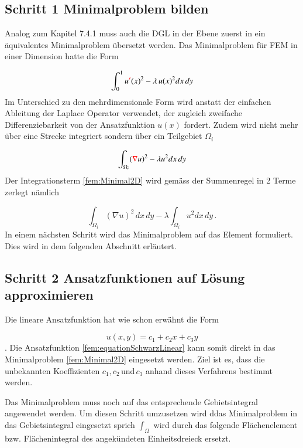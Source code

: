 \subsection{Schritt 1 Minimalproblem bilden}

Analog zum Kapitel 7.4.1 muss auch die DGL in der Ebene zuerst in ein äquivalentes Minimalproblem übersetzt werden. Das Minimalproblem für FEM in einer Dimension hatte die Form

\begin{equation}
			\int_0^1 u \textcolor{red}{'} (x)^2 - \lambda \, u(x)^2 dx \,dy
			\label{fem:Minimal1D}
\end{equation}
Im Unterschied zu den mehrdimensionale Form wird anstatt der einfachen Ableitung der Laplace Operator verwendet, der zugleich zweifache Differenziebarkeit von der Ansatzfunktion $u(x)$ fordert. Zudem wird nicht mehr über eine Strecke integriert sondern über ein Teilgebiet $\Omega_i$

\begin{equation}
			\int_{\Omega_i} (\textcolor{red}{\nabla} u)^2 - \lambda u^2 dx \, dy
			\label{fem:Minimal2D}
\end{equation}
Der Integrationsterm \ref{fem:Minimal2D} wird gemäss der Summenregel in 2 Terme zerlegt nämlich 

\begin{equation}
			\int_{\Omega_i} (\nabla u)^2 \, dx \, dy - \lambda \int_{\Omega_i} u^2 dx \, dy \, .
			\label{fem:Minimal2D2Term}
\end{equation}
In einem nächsten Schritt wird das Minimalproblem auf das Element formuliert. Dies wird in dem folgenden Abschnitt erläutert.

\subsection{Schritt 2 Ansatzfunktionen auf Lösung approximieren}

Die lineare Ansatzfunktion hat wie schon erwähnt die Form

\begin{equation}
u(x,y) = c_1 + c_2x + c_3y
\label{fem:equationSchwarzLinear}
\end{equation}.
Die Ansatzfunktion \eqref{fem:equationSchwarzLinear} kann somit direkt in das Minimalproblem \eqref{fem:Minimal2D} eingesetzt werden. Ziel ist es, dass die unbekannten Koeffizienten $c_1, c_2 \, $und$ \, c_3$ anhand dieses Verfahrens bestimmt werden.

Das Minimalproblem muss noch auf das entsprechende Gebietsintegral angewendet werden. Um diesen Schritt umzusetzen wird ddas Minimalproblem in das Gebietsintegral eingesetzt sprich $\int_{\Omega}$ wird durch das folgende Flächenelement bzw. Flächenintegral des angekündeten Einheitsdreieck ersetzt. 

